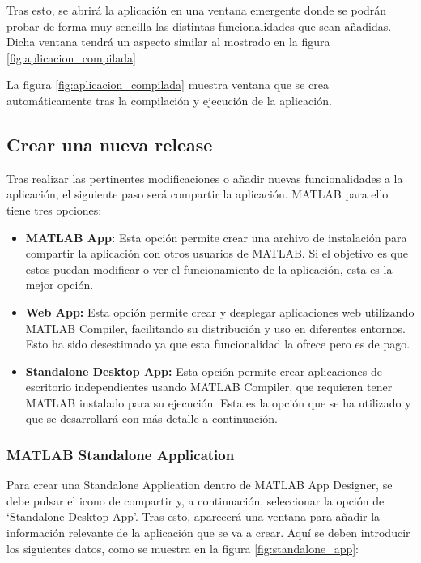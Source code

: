 Tras esto, se abrirá la aplicación en una ventana emergente donde se podrán probar de forma muy sencilla las distintas funcionalidades que sean añadidas. Dicha ventana tendrá un aspecto similar al mostrado en la figura \ref{fig:aplicacion_compilada}


La figura \ref{fig:aplicacion_compilada} muestra ventana que se crea automáticamente tras la compilación y ejecución de la aplicación.

\subsection{Crear una nueva release}\label{crear-una-nueva-release}

Tras realizar las pertinentes modificaciones o añadir nuevas funcionalidades a la aplicación, el siguiente paso será compartir la aplicación. MATLAB para ello tiene tres opciones:

\begin{itemize}
    \item \textbf{MATLAB App:} Esta opción permite crear una archivo de instalación para compartir la aplicación con otros usuarios de MATLAB. Si el objetivo es que estos puedan modificar o ver el funcionamiento de la aplicación, esta es la mejor opción.
    \item \textbf{Web App:} Esta opción permite crear y desplegar aplicaciones web utilizando MATLAB Compiler, facilitando su distribución y uso en diferentes entornos. Esto ha sido desestimado ya que esta funcionalidad la ofrece pero es de pago.
    \item \textbf{Standalone Desktop App:} Esta opción permite crear aplicaciones de escritorio independientes usando MATLAB Compiler, que requieren tener MATLAB instalado para su ejecución. Esta es la opción que se ha utilizado y que se desarrollará con más detalle a continuación.
\end{itemize}

\subsubsection{MATLAB Standalone Application}\label{matlab-standalone-application}

Para crear una Standalone Application dentro de MATLAB App Designer, se debe pulsar el icono de compartir y, a continuación, seleccionar la opción de `Standalone Desktop App'. Tras esto, aparecerá una ventana para añadir la información relevante de la aplicación que se va a crear. Aquí se deben introducir los siguientes datos, como se muestra en la figura \ref{fig:standalone_app}:

